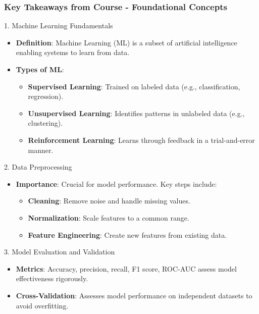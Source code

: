 \documentclass[aspectratio=169]{beamer}
\begin{document}
\begin{frame}[fragile]
    \frametitle{Key Takeaways from Course - Foundational Concepts}
    \begin{block}{1. Machine Learning Fundamentals}
        \begin{itemize}
            \item \textbf{Definition}: Machine Learning (ML) is a subset of artificial intelligence enabling systems to learn from data.
            \item \textbf{Types of ML}: 
            \begin{itemize}
                \item \textbf{Supervised Learning}: Trained on labeled data (e.g., classification, regression).
                \item \textbf{Unsupervised Learning}: Identifies patterns in unlabeled data (e.g., clustering).
                \item \textbf{Reinforcement Learning}: Learns through feedback in a trial-and-error manner.
            \end{itemize}
        \end{itemize}
    \end{block}
    
    \begin{block}{2. Data Preprocessing}
        \begin{itemize}
            \item \textbf{Importance}: Crucial for model performance. Key steps include:
            \begin{itemize}
                \item \textbf{Cleaning}: Remove noise and handle missing values.
                \item \textbf{Normalization}: Scale features to a common range.
                \item \textbf{Feature Engineering}: Create new features from existing data.
            \end{itemize}
        \end{itemize}
    \end{block}
    
    \begin{block}{3. Model Evaluation and Validation}
        \begin{itemize}
            \item \textbf{Metrics}: Accuracy, precision, recall, F1 score, ROC-AUC assess model effectiveness rigorously.
            \item \textbf{Cross-Validation}: Assesses model performance on independent datasets to avoid overfitting.
        \end{itemize}
    \end{block}
\end{frame}
\end{document}
